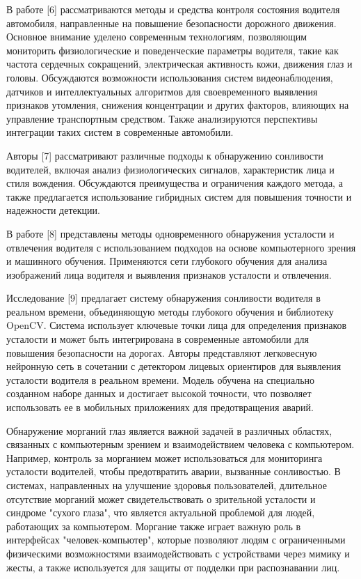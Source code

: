 В работе {[}6{]} рассматриваются методы и средства контроля состояния
водителя автомобиля, направленные на повышение безопасности дорожного
движения. Основное внимание уделено современным технологиям, позволяющим
мониторить физиологические и поведенческие параметры водителя, такие как
частота сердечных сокращений, электрическая активность кожи, движения
глаз и головы. Обсуждаются возможности использования систем
видеонаблюдения, датчиков и интеллектуальных алгоритмов для
своевременного выявления признаков утомления, снижения концентрации и
других факторов, влияющих на управление транспортным средством. Также
анализируются перспективы интеграции таких систем в современные
автомобили.

Авторы {[}7{]} рассматривают различные подходы к обнаружению сонливости
водителей, включая анализ физиологических сигналов, характеристик лица и
стиля вождения. Обсуждаются преимущества и ограничения каждого метода, а
также предлагается использование гибридных систем для повышения точности
и надежности детекции.

В работе {[}8{]} представлены методы одновременного обнаружения
усталости и отвлечения водителя с использованием подходов на основе
компьютерного зрения и машинного обучения. Применяются сети глубокого
обучения для анализа изображений лица водителя и выявления признаков
усталости и отвлечения.

Исследование {[}9{]} предлагает систему обнаружения сонливости водителя
в реальном времени, объединяющую методы глубокого обучения и библиотеку
OpenCV. Система использует ключевые точки лица для определения признаков
усталости и может быть интегрирована в современные автомобили для
повышения безопасности на дорогах. Авторы представляют легковесную
нейронную сеть в сочетании с детектором лицевых ориентиров для выявления
усталости водителя в реальном времени. Модель обучена на специально
созданном наборе данных и достигает высокой точности, что позволяет
использовать ее в мобильных приложениях для предотвращения аварий.

Обнаружение морганий глаз является важной задачей в различных областях,
связанных с компьютерным зрением и взаимодействием человека с
компьютером. Например, контроль за морганием может использоваться для
мониторинга усталости водителей, чтобы предотвратить аварии, вызванные
сонливостью. В системах, направленных на улучшение здоровья
пользователей, длительное отсутствие морганий может свидетельствовать о
зрительной усталости и синдроме "сухого глаза", что является актуальной
проблемой для людей, работающих за компьютером. Моргание также играет
важную роль в интерфейсах "человек-компьютер", которые позволяют людям с
ограниченными физическими возможностями взаимодействовать с устройствами
через мимику и жесты, а также используется для защиты от подделки при
распознавании лиц.

